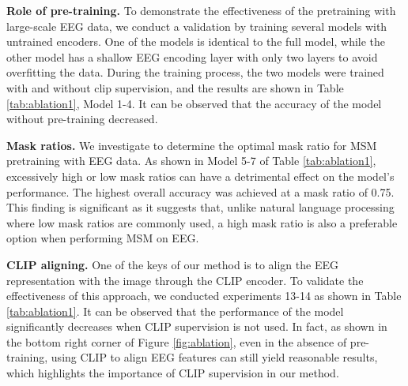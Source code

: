 \documentclass[10pt,twocolumn,letterpaper]{article}
\begin{document}
\noindent\textbf{Role of pre-training.}
To demonstrate the effectiveness of the pretraining with large-scale EEG data, we conduct a validation by training several models with untrained encoders. One of the models is identical to the full model, while the other model has a shallow EEG encoding layer with only two layers to avoid overfitting the data. During the training process, the two models were trained with and without clip supervision, and the results are shown in Table \ref{tab:ablation1}, Model 1-4. It can be observed that the accuracy of the model without pre-training decreased.




\noindent\textbf{Mask ratios.} We investigate to determine the optimal mask ratio for MSM pretraining with EEG data. As shown in Model 5-7 of Table \ref{tab:ablation1}, excessively high or low mask ratios can have a detrimental effect on the model's performance. The highest overall accuracy was achieved at a mask ratio of 0.75. This finding is significant as it suggests that, unlike natural language processing where low mask ratios are commonly used, a high mask ratio is also a preferable option when performing MSM on EEG.


\noindent\textbf{CLIP aligning.} One of the keys of our method is to align the EEG representation with the image through the CLIP encoder. To validate the effectiveness of this approach, we conducted experiments 13-14 as shown in Table \ref{tab:ablation1}. It can be observed that the performance of the model significantly decreases when CLIP supervision is not used. In fact, as shown in the bottom right corner of Figure \ref{fig:ablation}, even in the absence of pre-training, using CLIP to align EEG features can still yield reasonable results, which highlights the importance of CLIP supervision in our method.
\end{document}
